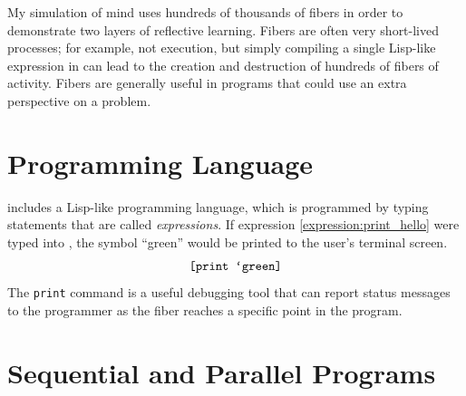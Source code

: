 My simulation of mind uses hundreds of thousands of fibers in order to
demonstrate two layers of reflective learning.  Fibers are often very
short-lived processes; for example, not execution, but simply
compiling a single Lisp-like expression in {\SALS} can lead to the
creation and destruction of hundreds of fibers of activity.  Fibers
are generally useful in programs that could use an extra perspective
on a problem.

\section{Programming Language}

{\SALS} includes a Lisp-like programming language, which is programmed
by typing statements that are called \emph{expressions}.  If
expression \ref{expression:print_hello} were typed into {\SALS}, the
symbol ``green'' would be printed to the user's terminal screen.
\begin{equation}
\label{expression:print_hello}
\text{\tt [print `green]}
\end{equation}
The {\tt print} command is a useful debugging tool that can report
status messages to the programmer as the fiber reaches a specific
point in the program.

\section{Sequential and Parallel Programs}

